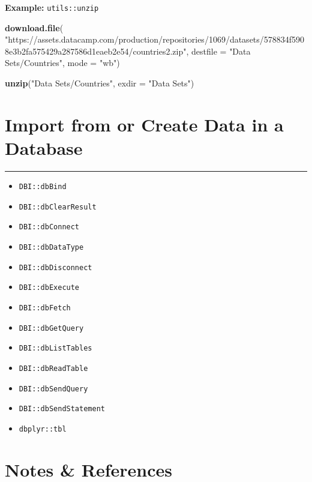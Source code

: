 \documentclass[
]{book}
\newenvironment{Shaded}{\begin{snugshade}}{\end{snugshade}}
\newcommand{\DataTypeTok}[1]{\textcolor[rgb]{0.13,0.29,0.53}{#1}}
\newcommand{\KeywordTok}[1]{\textcolor[rgb]{0.13,0.29,0.53}{\textbf{#1}}}
\newcommand{\NormalTok}[1]{#1}
\newcommand{\StringTok}[1]{\textcolor[rgb]{0.31,0.60,0.02}{#1}}
\providecommand{\tightlist}{%
  \setlength{\itemsep}{0pt}\setlength{\parskip}{0pt}}
\begin{document}
\textbf{Example:} \texttt{utils::unzip}

\begin{Shaded}
\begin{Highlighting}[]
\KeywordTok{download.file}\NormalTok{(}
  \StringTok{"https://assets.datacamp.com/production/repositories/1069/datasets/578834f5908e3b2fa575429a287586d1eaeb2e54/countries2.zip"}\NormalTok{,}
  \DataTypeTok{destfile =} \StringTok{"Data Sets/Countries"}\NormalTok{,}
  \DataTypeTok{mode =} \StringTok{"wb"}\NormalTok{)}

\KeywordTok{unzip}\NormalTok{(}\StringTok{"Data Sets/Countries"}\NormalTok{, }\DataTypeTok{exdir =} \StringTok{"Data Sets"}\NormalTok{)}
\end{Highlighting}
\end{Shaded}

\hypertarget{import-from-or-create-data-in-a-database}{%
\section{Import from or Create Data in a Database}\label{import-from-or-create-data-in-a-database}}

\begin{center}\rule{0.5\linewidth}{0.5pt}\end{center}

\begin{itemize}
\tightlist
\item
  \texttt{DBI::dbBind}
\item
  \texttt{DBI::dbClearResult}
\item
  \texttt{DBI::dbConnect}
\item
  \texttt{DBI::dbDataType}
\item
  \texttt{DBI::dbDisconnect}
\item
  \texttt{DBI::dbExecute}
\item
  \texttt{DBI::dbFetch}
\item
  \texttt{DBI::dbGetQuery}
\item
  \texttt{DBI::dbListTables}
\item
  \texttt{DBI::dbReadTable}
\item
  \texttt{DBI::dbSendQuery}
\item
  \texttt{DBI::dbSendStatement}
\item
  \texttt{dbplyr::tbl}
\end{itemize}

\hypertarget{notes-references}{%
\section{Notes \& References}\label{notes-references}}
\end{document}
